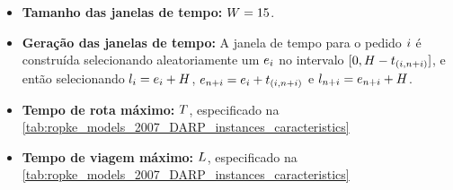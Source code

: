 \documentclass{anpet}
\begin{document}
\begin{itemize}
\begin{itemize}
    \end{itemize}
    \item \textbf{Tamanho das janelas de tempo:} $W= 15$.
    \item \textbf{Geração das janelas de tempo:} A janela de tempo para o pedido $i$ é construída selecionando aleatoriamente um $e_i{}$ no intervalo $[0,H - t_{(i{},{n{} + i{}})}]$, e então selecionando $l_i = e_i{} + H$, $e_{{n{} + i{}}} = e_i{} + t_{(i{},{n{} + i{}})}$ e $l_{{n{} + i{}}} = e_{{n{} + i{}}} + H$.
    \item \textbf{Tempo de rota máximo:} $T$, especificado na \autoref{tab:ropke_models_2007_DARP_instances_caracteristics}
    \item \textbf{Tempo de viagem máximo:} $L$, especificado na \autoref{tab:ropke_models_2007_DARP_instances_caracteristics}
\end{itemize}
\end{document}

